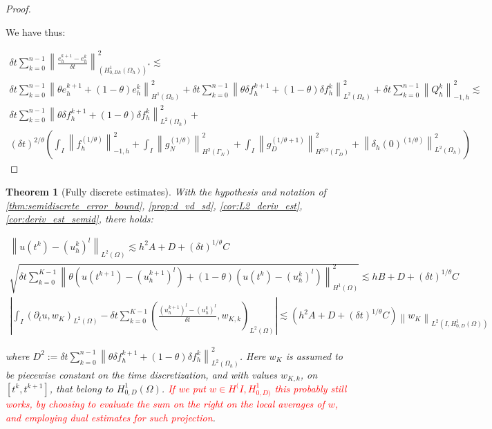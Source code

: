 \documentclass[english,a4paper,10pt,oneside]{scrbook}	%
\theoremstyle{break}
\newtheorem{thm}[equation]{Theorem}
\newenvironment{mproof}[1][\proofname]{%
  \begin{proof}[#1]$ $\par\nobreak\ignorespaces
}{%
  \end{proof}
}
\renewcommand*{\proofname}{Proof}
\theoremstyle{remark}
\newcommand{\ds}{\displaystyle}
\newcommand{\norm}[1]{\left\lVert#1\right\rVert}
\begin{document}
\begin{mproof}
We have thus:

\begin{align*}
\delta t \sum_{k=0}^{n-1} \norm{ \frac{e_{h}^{k+1}-e_h^k}{\delta t}}_{(H^1_{0,Dh}(\Omega_h))^*}^2 \lesssim  \\\delta t \sum_{k=0}^{n-1}\norm{\theta e_h^{k+1}+(1-\theta)e^k_h}_{H^1(\Omega_h)}^2 + \delta t \sum_{k=0}^{n-1} \norm{\theta \delta f_h^{k+1}+(1-\theta)\delta f_h^k}_{L^2(\Omega_h)}^2+ \delta t \sum_{k=0}^{n-1} \norm{Q_h^k}_{-1,h}^2\lesssim\\
\delta t \sum_{k=0}^{n-1} \norm{\theta \delta f_h^{k+1}+(1-\theta)\delta f_h^k}_{L^2(\Omega_h)}^2 +\\
(\delta t)^{2/\theta} \left( \int_I \norm{f^{(1/\theta)}_h}_{-1,h}^2+\int_I\norm{ g_{N}^{(1/\theta)}}_{H^{2}(\Gamma_{N})}^2 + \int_I\norm{g_D^{(1/\theta+1)}}_{H^{3/2}(\Gamma_D)}^2 + \norm{\delta_{h}(0)^{(1/\theta)}}_{L^2(\Omega_h)}^2\right)
\end{align*}

\end{mproof}

\begin{thm}[Fully discrete estimates]
\label{thm:fully_discr_est_par}
With the hypothesis and notation of \cref{thm:semidiscrete_error_bound}, \cref{prop:d_vd_sd}, \cref{cor:L2_deriv_est}, \cref{cor:deriv_est_semid}, there holds:

\begin{align*}
	\norm{u(t^k)-(u_h^k)^l}_{L^2(\Omega)}\lesssim  h^2 A  + D +  (\delta t)^{1/\theta}C\\
	\sqrt{\delta t \sum_{k=0}^{K-1} \norm{\theta(u(t^{k+1}) - (u_h^{k+1})^l) + (1-\theta)(u(t^{k}) - (u_h^{k})^l)}_{H^1(\Omega)}^2} \lesssim hB + D + (\delta t)^{1/\theta} C\\
	\left | \int_I (\partial_t u , w_K)_{L^2(\Omega)}-\delta t \sum_{k=0}^{K-1}\left ( \frac{(u^{k+1}_h)^l - (u_h^k)^l}{\delta t} , w_{K,k}\right )_{L^2(\Omega)} \right |\lesssim \left ( h^2A + D + (\delta t)^{1/\theta} C\right ) \norm{w_K}_{L^2(I,H^1_{0,D}(\Omega))}
\end{align*}

where $D^2:= \ds {\delta t\sum_{k=0}^{n-1} \norm{\theta \delta f_h^{k+1}+(1-\theta)\delta f_h^k}_{L^2(\Omega_h)}^2}$. Here $w_K$ is assumed to be piecewise constant on the time discretization, and with values $w_{K,k}$, on $[t^k,t^{k+1}]$, that belong to $H^1_{0,D}(\Omega)$. \textcolor{red}{If we put $w \in H^(I,H^1_{0,D)}$ this probably still works, by choosing to evaluate the sum on the right on the local averages of $w$, and employing dual estimates for such projection}.
\end{thm}
\end{document}
